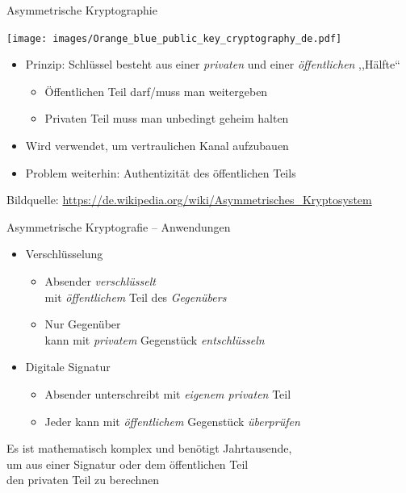   \begin{frame}{Asymmetrische Kryptographie}
    \begin{center}
      \texttt{[image: images/Orange\_blue\_public\_key\_cryptography\_de.pdf]}
    \end{center}
    \begin{itemize}
      \item Prinzip: Schlüssel besteht aus einer \emph{privaten} und einer \emph{öffentlichen} ,,Hälfte``
      \begin{itemize}
        \item Öffentlichen Teil darf/muss man weitergeben
        \item Privaten Teil muss man unbedingt geheim halten
      \end{itemize}
      \item Wird verwendet, um vertraulichen Kanal aufzubauen
      \item Problem weiterhin: Authentizität des öffentlichen Teils
    \end{itemize}
    \tiny Bildquelle: \url{https://de.wikipedia.org/wiki/Asymmetrisches_Kryptosystem}
  \end{frame}

  \begin{frame}{Asymmetrische Kryptografie -- Anwendungen}
    \begin{itemize}
      \item Verschlüsselung
        \begin{itemize}
          \item Absender \emph{verschlüsselt}\\ mit \emph{öffentlichem} Teil des \emph{Gegenübers}
          \item Nur Gegenüber\\ kann mit \emph{privatem} Gegenstück \emph{entschlüsseln}
        \end{itemize}
      \item Digitale Signatur
        \begin{itemize}
          \item Absender unterschreibt mit \emph{eigenem privaten} Teil
          \item Jeder kann mit \emph{öffentlichem} Gegenstück \emph{überprüfen}
        \end{itemize}
    \end{itemize}
    Es ist mathematisch komplex und benötigt Jahrtausende,\\ um aus einer Signatur oder dem öffentlichen Teil\\ den privaten Teil zu berechnen
  \end{frame}


